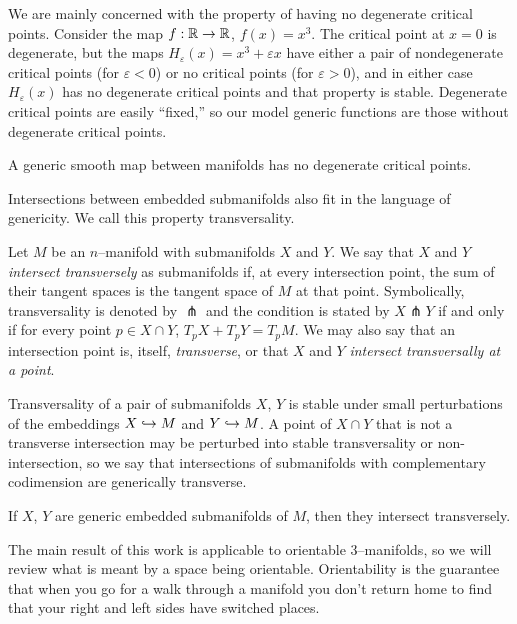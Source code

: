We are mainly concerned with the property of having no degenerate critical points.
Consider the map $f:\mathbb{R}\to\mathbb{R}$, $f(x)=x^3$.
The critical point at $x=0$ is degenerate, but the maps $H_{\varepsilon}(x)=x^3+\varepsilon x$ have either a pair of nondegenerate critical points (for $\varepsilon<0$) or no critical points (for $\varepsilon>0$), and in either case $H_{\varepsilon}(x)$ has no degenerate critical points and that property is stable.
Degenerate critical points are easily ``fixed,'' so our model generic functions are those without degenerate critical points.

\begin{prop}
	A generic smooth map between manifolds has no degenerate critical points.
\end{prop}

Intersections between embedded submanifolds also fit in the language of genericity.
We call this property transversality.

\begin{defn}
	Let $M$ be an $n$--manifold with submanifolds $X$ and $Y$.
	We say that $X$ and $Y$ \emph{intersect transversely} as submanifolds if, at every intersection point, the sum of their tangent spaces is the tangent space of $M$ at that point.
	Symbolically, transversality is denoted by $\pitchfork$ and the condition is stated by $X\pitchfork Y$ if and only if for every point $p\in X\cap Y$, $T_p X+ T_p Y=T_p M$.
	We may also say that an intersection point is, itself, \emph{transverse}, or that $X$ and $Y$ \emph{intersect transversally at a point}.	
\end{defn}

Transversality of a pair of submanifolds $X$, $Y$ is stable under small perturbations of the embeddings $X\hookrightarrow M$ and $Y\hookrightarrow M$.
A point of $X\cap Y$ that is not a transverse intersection may be perturbed into stable transversality or non-intersection, so we say that intersections of submanifolds with complementary codimension are generically transverse.

\begin{prop}
	If $X$, $Y$ are generic embedded submanifolds of $M$, then they intersect transversely.
\end{prop}

The main result of this work is applicable to orientable 3--manifolds, so we will review what is meant by a space being orientable.
Orientability is the guarantee that when you go for a walk through a manifold you don't return home to find that your right and left sides have switched places.

